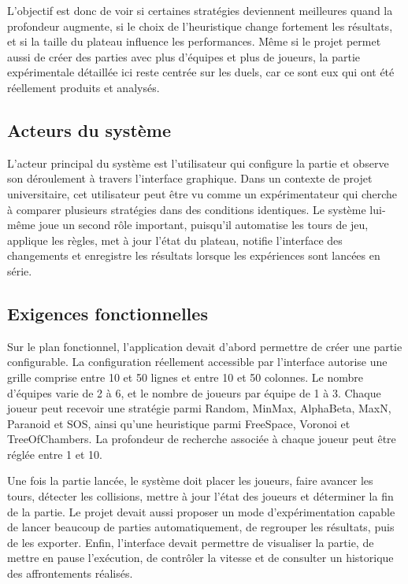 \documentclass[11pt,a4paper]{article}
\begin{document}
L’objectif est donc de voir si certaines stratégies deviennent meilleures quand la profondeur augmente, si le choix de l’heuristique change fortement les résultats, et si la taille du plateau influence les performances. Même si le projet permet aussi de créer des parties avec plus d’équipes et plus de joueurs, la partie expérimentale détaillée ici reste centrée sur les duels, car ce sont eux qui ont été réellement produits et analysés.

\subsection{Acteurs du système}

L'acteur principal du système est l'utilisateur qui configure la partie et observe son déroulement à travers l'interface graphique. Dans un contexte de projet universitaire, cet utilisateur peut être vu comme un expérimentateur qui cherche à comparer plusieurs stratégies dans des conditions identiques. Le système lui-même joue un second rôle important, puisqu'il automatise les tours de jeu, applique les règles, met à jour l'état du plateau, notifie l'interface des changements et enregistre les résultats lorsque les expériences sont lancées en série.

\subsection{Exigences fonctionnelles}

Sur le plan fonctionnel, l'application devait d'abord permettre de créer une partie configurable. La configuration réellement accessible par l'interface autorise une grille comprise entre 10 et 50 lignes et entre 10 et 50 colonnes. Le nombre d'équipes varie de 2 à 6, et le nombre de joueurs par équipe de 1 à 3. Chaque joueur peut recevoir une stratégie parmi Random, MinMax, AlphaBeta, MaxN, Paranoid et SOS, ainsi qu'une heuristique parmi FreeSpace, Voronoi et TreeOfChambers. La profondeur de recherche associée à chaque joueur peut être réglée entre 1 et 10.

Une fois la partie lancée, le système doit placer les joueurs, faire avancer les tours, détecter les collisions, mettre à jour l'état des joueurs et déterminer la fin de la partie. Le projet devait aussi proposer un mode d'expérimentation capable de lancer beaucoup de parties automatiquement, de regrouper les résultats, puis de les exporter. Enfin, l'interface devait permettre de visualiser la partie, de mettre en pause l'exécution, de contrôler la vitesse et de consulter un historique des affrontements réalisés.
\end{document}
